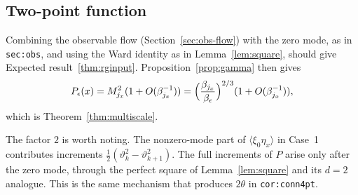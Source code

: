 \documentclass[11pt]{amsart}
\theoremstyle{definition}
\theoremstyle{remark}
\numberwithin{equation}{section}
\newcommand{\avg}[1]{\langle #1\rangle}
\begin{document}
\subsection{Two-point function}
Combining the observable flow (Section~\ref{sec:obs-flow}) with the zero mode, as in
\texttt{sec:obs}, and using the Ward identity as in Lemma~\ref{lem:square}, should give
Expected result~\ref{thm:rginput}. Proposition~\ref{prop:gamma} then gives
\[
  P_\epsilon(x)=M_{j_x}^2(1+O(\beta_{j_x}^{-1}))=\Bigl(\frac{\beta_{j_x}}{\beta_\epsilon}\Bigr)^{2/3}(1+O(\beta_{j_x}^{-1})),
\]
which is Theorem~\ref{thm:multiscale}.

The factor $2$ is worth noting. The nonzero-mode part of $\avg{\xi_0\eta_x}$ in Case~1 contributes
increments $\frac12(\vartheta_k^2-\vartheta_{k+1}^2)$. The full increments of $P$ arise only
after the zero mode, through the perfect square of Lemma~\ref{lem:square} and its $d=2$ analogue. This is the same
mechanism that produces $2\theta$ in \texttt{cor:conn4pt}.
\end{document}
